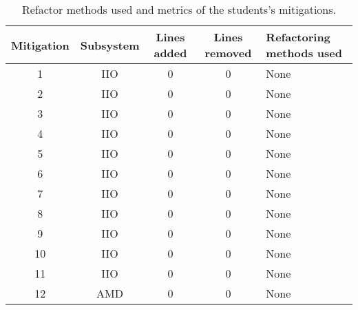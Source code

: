 \begin{table}
\begin{tabular}{ | c | c | c | c | m{6em} | }

\hline

\textbf{Mitigation} & \textbf{Subsystem} & \textbf{Lines added} & \textbf{Lines removed} & \textbf{Refactoring methods used}
\\ \hline 

1 & IIO & 0 & 0 & None \\ \hline
2 & IIO & 0 & 0 & None \\ \hline
3 & IIO & 0 & 0 & None \\ \hline
4 & IIO & 0 & 0 & None \\ \hline
5 & IIO & 0 & 0 & None \\ \hline
6 & IIO & 0 & 0 & None \\ \hline
7 & IIO & 0 & 0 & None \\ \hline
8 & IIO & 0 & 0 & None \\ \hline
9 & IIO & 0 & 0 & None \\ \hline
10 & IIO & 0 & 0 & None \\ \hline
11 & IIO & 0 & 0 & None \\ \hline
12 & AMD & 0 & 0 & None \\ \hline

\hline
\end{tabular}
\caption{Refactor methods used and metrics of the students's mitigations.}
\label{tab:stu}
\end{table}
